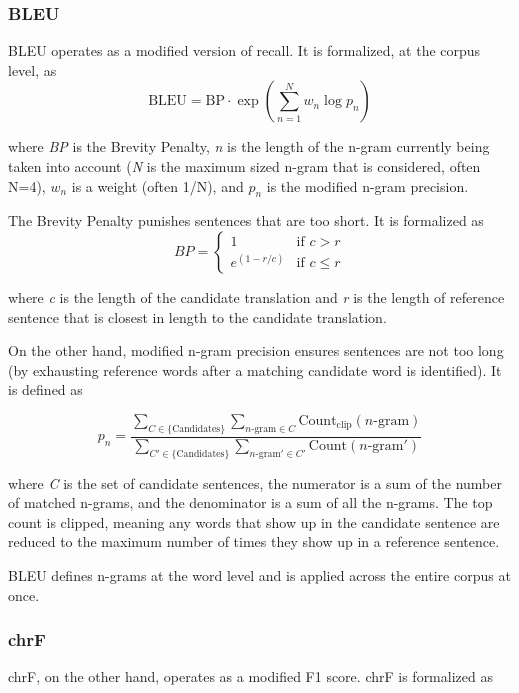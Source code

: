\subsubsection{BLEU}
BLEU operates as a modified version of recall. It is formalized, at the corpus level, as 
\[
\text{BLEU} = \text{BP} \cdot \exp \left( \sum\limits_{n=1}^{N} w_{n} \log p_{n} \right)
\]
\begin{center}
where \textit{BP} is the Brevity Penalty, \textit{n} is the length of the n-gram currently being taken into account (\textit{N} is the maximum sized n-gram that is considered, often N=4), \textit{$w_n$} is a weight (often 1/N), and \textit{$p_n$} is the modified n-gram precision.
\end{center}


The Brevity Penalty punishes sentences that are too short. It is formalized as 
\[
BP = \begin{cases} 
1 & \text{if } c > r \\ 
e^{(1-r/c)} & \text{if } c \le r 
\end{cases}
\]
\begin{center}
where \textit{c} is the length of the candidate translation and \textit{r} is the length of reference sentence that is closest in length to the candidate translation.
\end{center}

On the other hand, modified n-gram precision ensures sentences are not too long (by exhausting reference words after a matching candidate word is identified). It is defined as

\[
p_n = \frac{\sum_{C \in \{\text{Candidates}\}} \sum_{n\text{-gram} \in C} \text{Count}_{\text{clip}}(n\text{-gram})}{\sum_{C' \in \{\text{Candidates}\}} \sum_{n\text{-gram}' \in C'} \text{Count}(n\text{-gram}')}
\]
\begin{center}
where \textit{C} is the set of candidate sentences, the numerator is a sum of the number of matched n-grams, and the denominator is a sum of all the n-grams. The top count is clipped, meaning any words that show up in the candidate sentence are reduced to the maximum number of times they show up in a reference sentence.
\end{center}

BLEU defines n-grams at the word level and is applied across the entire corpus at once.

\subsubsection{chrF}
chrF, on the other hand, operates as a modified F1 score. chrF is formalized as


